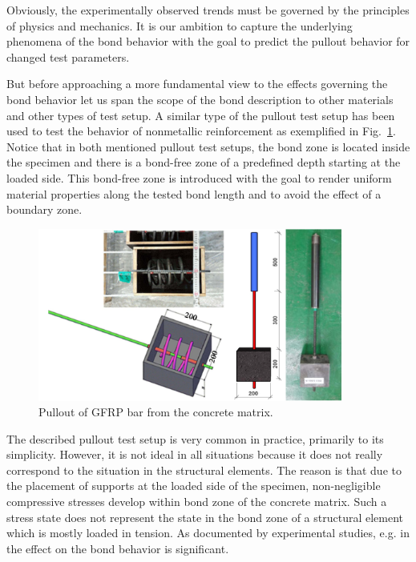 \documentclass[main.tex]{subfiles}
\begin{document}
Obviously, the experimentally observed trends must be governed by the principles of physics and mechanics. It is our ambition to capture the underlying phenomena of the bond behavior with the goal to predict the  pullout behavior for changed test parameters. 

But before approaching a more fundamental view to the effects governing the bond behavior let us span the scope of the bond description to other materials and other types of test setup. 
A similar type of the pullout test setup has been used to test the behavior of nonmetallic reinforcement as exemplified in Fig.~\ref{fig:gfrp_pullout}.
Notice that in both mentioned pullout test setups, the bond zone is located inside the specimen and 
there is a bond-free zone of a predefined depth starting at the loaded side. This bond-free zone is introduced with the goal to render uniform material properties along the tested bond length and to avoid the effect of a boundary zone.
\begin{figure}[tb]
	\centering
  \includegraphics[width=10cm]{fig/Lecture02/gfrp_pullout.png}
	\caption{Pullout of GFRP bar from the concrete matrix.}
	\label{fig:gfrp_pullout}
\end{figure}

The described pullout test setup is very common in practice, primarily to
its simplicity. However, it is not ideal in all situations
because it does not really correspond to the situation in the structural elements.
The reason is that due to the placement of supports at the loaded side of the
specimen, non-negligible compressive
stresses develop within bond zone of the concrete matrix. 
Such a stress state does not represent the state 
in the bond zone of a structural element which is mostly
loaded in tension. As documented by experimental studies, e.g. in \cite{de2008bond}
the effect on the bond behavior is significant.
\end{document}
